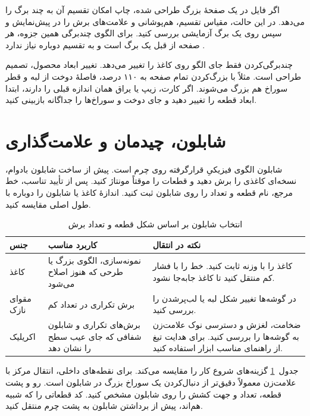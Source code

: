 اگر فایل در یک صفحۀ بزرگ طراحی شده، چاپ  امکان تقسیم آن به چند برگ را می‌دهد. در این حالت، مقیاس تقسیم، هم‌پوشانی و علامت‌های برش را در پیش‌نمایش و سپس روی یک برگ آزمایشی بررسی کنید. برای الگوی چندبرگی همین جزوه، هر صفحه از قبل یک برگ  است و به تقسیم دوباره نیاز ندارد \cite{adobe-poster}.

چندبرگی‌کردن فقط جای الگو روی کاغذ را تغییر می‌دهد. تغییر ابعاد محصول، تصمیم طراحی است. مثلاً با بزرگ‌کردن تمام صفحه به ۱۱۰ درصد، فاصلۀ دوخت از لبه و قطر سوراخ هم بزرگ می‌شوند. اگر کارت، زیپ یا یراق همان اندازه قبلی را دارند، ابتدا ابعاد قطعه را تغییر دهید و جای دوخت و سوراخ‌ها را جداگانه بازبینی کنید.

\section{شابلون، چیدمان و علامت‌گذاری}

شابلون الگوی فیزیکیِ قرارگرفته روی چرم است. پیش از ساخت شابلون بادوام، نسخه‌ای کاغذی را برش دهید و قطعات را موقتاً مونتاژ کنید. پس از تأیید تناسب، خط مرجع، نام قطعه و تعداد را روی شابلون ثبت کنید. اندازۀ کاغذ یا شابلون را دوباره با طول اصلی مقایسه کنید.

\begin{table}[!htbp]
  \centering
  \caption{انتخاب شابلون بر اساس شکل قطعه و تعداد برش}
  \label{tab:template}
  \begin{tabular}{@{}p{29mm}p{50mm}p{67mm}@{}}
    \toprule
    جنس & کاربرد مناسب & نکته در انتقال \\
    \midrule
    کاغذ & نمونه‌سازی، الگوی بزرگ یا طرحی که هنوز اصلاح می‌شود & کاغذ را با وزنه ثابت کنید. خط را با فشار کم منتقل کنید تا کاغذ جابه‌جا نشود. \\
    مقوای نازک & برش تکراری در تعداد کم & در گوشه‌ها تغییر شکل لبه یا لب‌پرشدن را بررسی کنید. \\
    اکریلیک & برش‌های تکراری و شابلون شفافی که جای عیب سطح را نشان دهد & ضخامت، لغزش و دسترسی نوک علامت‌زن به گوشه‌ها را بررسی کنید. برای هدایت تیغ از راهنمای مناسب ابزار استفاده کنید. \\
    \bottomrule
  \end{tabular}
\end{table}

جدول~\ref{tab:template} گزینه‌های شروع کار را مقایسه می‌کند. برای نقطه‌های داخلی، انتقال مرکز با علامت‌زن معمولاً دقیق‌تر از دنبال‌کردن یک سوراخ بزرگ در شابلون است. رو و پشت قطعه، تعداد و جهت کشش را روی شابلون مشخص کنید. کد قطعاتی را که شبیه هم‌اند، پیش از برداشتن شابلون به پشت چرم منتقل کنید.

